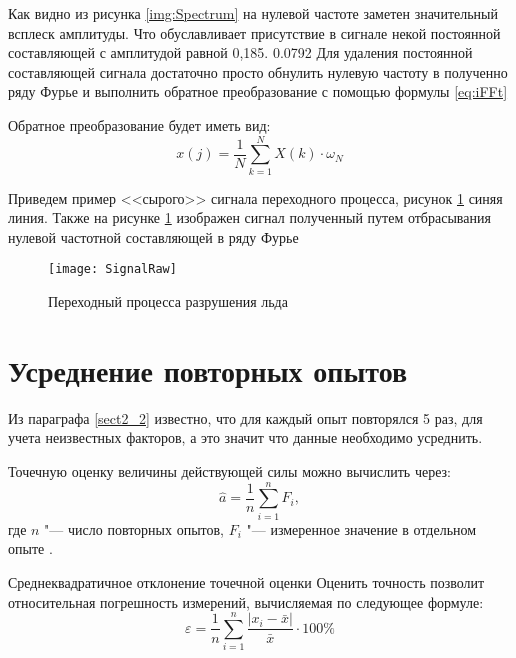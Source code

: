 Как видно из рисунка \ref{img:Spectrum} на нулевой частоте заметен значительный всплеск амплитуды. Что обуславливает присутствие в сигнале некой постоянной составляющей с амплитудой равной 0,185. 0.0792  Для удаления постоянной составляющей сигнала достаточно просто обнулить нулевую частоту в полученно ряду Фурье и выполнить обратное преобразование с помощью формулы \ref{eq:iFFt}

Обратное преобразование будет иметь вид:
\begin{equation}\label{eq:iFFT}
x(j)=\frac{1}{N}\sum_{k=1}^{N} X(k)\cdot\omega_{N}
\end{equation}

Приведем пример <<сырого>> сигнала переходного процесса, рисунок \ref{img:SignalRaw} синяя линия. Также на рисунке \ref{img:SignalRaw} изображен сигнал полученный путем отбрасывания нулевой частотной составляющей в ряду Фурье
\begin{figure}[ht] 
	\center
	\texttt{[image: SignalRaw]}
	\caption{Переходный процесса разрушения льда} 
	\label{img:SignalRaw}  
\end{figure}



\section{Усреднение повторных опытов}

Из параграфа \ref{sect2_2} известно, что для каждый опыт повторялся 5 раз, для учета неизвестных факторов, а это значит что данные необходимо усреднить.

Точечную оценку величины действующей силы можно вычислить через:
\begin{equation}\label{eq:x_ocenka}
\hat{a}=\frac{1}{n}\sum_{i=1}^{n} F_i,
\end{equation}
где $ n $ "--- число повторных опытов, $ F_i $ "--- измеренное значение в отдельном опыте \cite{Zajigaev}.

Среднеквадратичное отклонение точечной оценки 
Оценить точность позволит относительная погрешность измерений, вычисляемая по следующее формуле:
\begin{equation}\label{eq:Error}
\varepsilon=\frac{1}{n}\sum_{i=1}^{n} \frac{\left| x_i-\bar{x}\right| }{\bar{x}}\cdot100\%
\end{equation}